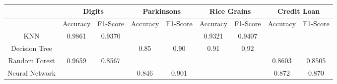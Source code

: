 \documentclass[letterpaper]{article}
\begin{document}
\begin{table}[h]
\begin{tabular}{|c|cc|cc|cc|cc|}
\hline
               & \multicolumn{2}{c|}{Digits}                                                          & \multicolumn{2}{c|}{Parkinsons}                                                    & \multicolumn{2}{c|}{Rice Grains}                                                     & \multicolumn{2}{c|}{Credit Loan}                                                     \\ \hline
               & \multicolumn{1}{c|}{Accuracy}                       & F1-Score                       & \multicolumn{1}{c|}{Accuracy}                      & F1-Score                      & \multicolumn{1}{c|}{Accuracy}                       & F1-Score                       & \multicolumn{1}{c|}{Accuracy}                       & F1-Score                       \\ \hline
KNN            & \multicolumn{1}{c|}{\cellcolor[HTML]{9B9B9B}0.9861} & \cellcolor[HTML]{9B9B9B}0.9370 & \multicolumn{1}{c|}{\cellcolor[HTML]{FFFFFF}}      & \cellcolor[HTML]{FFFFFF}      & \multicolumn{1}{c|}{\cellcolor[HTML]{9B9B9B}0.9321} & \cellcolor[HTML]{9B9B9B}0.9407 & \multicolumn{1}{c|}{\cellcolor[HTML]{FFFFFF}}       & \cellcolor[HTML]{FFFFFF}       \\ \hline
Decision Tree  & \multicolumn{1}{c|}{\cellcolor[HTML]{FFFFFF}}       & \cellcolor[HTML]{FFFFFF}       & \multicolumn{1}{c|}{\cellcolor[HTML]{9B9B9B}0.85}  & \cellcolor[HTML]{FFFFFF}0.90  & \multicolumn{1}{c|}{\cellcolor[HTML]{FFFFFF}0.91}   & \cellcolor[HTML]{FFFFFF}0.92   & \multicolumn{1}{c|}{\cellcolor[HTML]{FFFFFF}}       & \cellcolor[HTML]{FFFFFF}       \\ \hline
Random Forest  & \multicolumn{1}{c|}{\cellcolor[HTML]{FFFFFF}0.9659} & \cellcolor[HTML]{FFFFFF}0.8567 & \multicolumn{1}{c|}{\cellcolor[HTML]{FFFFFF}}      & \cellcolor[HTML]{FFFFFF}      & \multicolumn{1}{c|}{\cellcolor[HTML]{FFFFFF}}       & \cellcolor[HTML]{FFFFFF}       & \multicolumn{1}{c|}{\cellcolor[HTML]{FFFFFF}0.8603} & \cellcolor[HTML]{FFFFFF}0.8505 \\ \hline
Neural Network & \multicolumn{1}{c|}{\cellcolor[HTML]{FFFFFF}}       & \cellcolor[HTML]{FFFFFF}       & \multicolumn{1}{c|}{\cellcolor[HTML]{FFFFFF}0.846} & \cellcolor[HTML]{9B9B9B}0.901 & \multicolumn{1}{c|}{\cellcolor[HTML]{FFFFFF}}       & \cellcolor[HTML]{FFFFFF}       & \multicolumn{1}{c|}{\cellcolor[HTML]{9B9B9B}0.872}  & \cellcolor[HTML]{9B9B9B}0.870  \\ \hline
\end{tabular}
\end{table}
\end{document}
